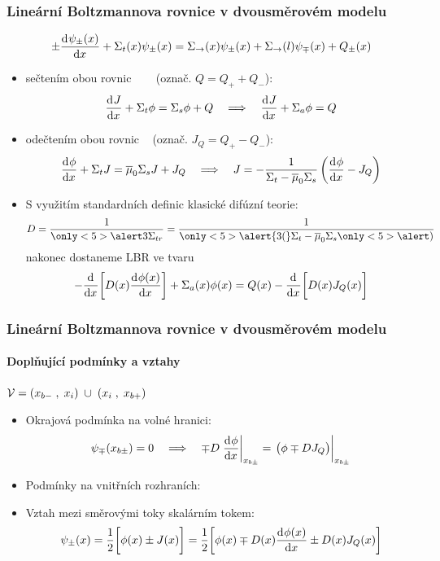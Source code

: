 \begin{frame}
  \frametitle{Lineární Boltzmannova rovnice v dvousměrovém modelu}

    $$
      \pm\frac{\mathrm{d}^{}{\psi_{\pm}(x)}}{\mathrm{d} {x}^{}} + \Sigma_t(x)\psi_{\pm}(x) = 
      \Sigma_{\rightarrow}(x)\psi_{\pm}(x) + \Sigma_{\rightarrow}(l)\psi_{\mp}(x) + Q_{\pm}(x)
    $$
    

    \begin{itemize}
    	\item<2-> sečtením obou rovnic ~~~ (označ. $Q = Q_+ + Q_-$):
    	$$
    	  \frac{\mathrm{d}^{}{J}}{\mathrm{d} {x}^{}} + \Sigma_t\phi = \Sigma_s\phi + Q
    	  \quad\Longrightarrow\quad
    	  \frac{\mathrm{d}^{}{J}}{\mathrm{d} {x}^{}} + \Sigma_a\phi = Q
    	$$
    	\item<3-> odečtením obou rovnic ~ (označ. $J_Q = Q_+ - Q_-$):
    	$$
    	  \frac{\mathrm{d}^{}{\phi}}{\mathrm{d} {x}^{}} + \Sigma_t J = \overline{\mu}_0\Sigma_s J + J_Q
    	  \quad\Longrightarrow\quad
    	  J = -\frac{1}{\Sigma_t-\overline{\mu}_0\Sigma_s}\left(\frac{\mathrm{d}^{}{\phi}}{\mathrm{d} {x}^{}} - J_Q\right)
    	$$
    	\item<4->[$\Rightarrow$] S využitím standardních definic \alert<5>{klasické difúzní teorie}:
    	$$
    	  D = \frac{1}{\only<5>{\alert3}\Sigma_{tr}} = \frac{1}{\only<5>{\alert{3(}}\Sigma_t-\muav\Sigma_s\only<5>{\alert)}}
    	$$
    	nakonec dostaneme LBR ve tvaru
    	$$
    	  -\frac{\mathrm{d}^{}{}}{\mathrm{d} {x}^{}}\bigg[D(x)\frac{\mathrm{d}^{}{\phi(x)}}{\mathrm{d} {x}^{}}\bigg] + \Sigma_a(x)\phi(x) = Q(x) - \frac{\mathrm{d}^{}{}}{\mathrm{d} {x}^{}}\bigg[D(x)J_Q(x)\bigg]
    	$$
    	\end{itemize}

\end{frame}

\begin{frame}
  \frametitle{Lineární Boltzmannova rovnice v dvousměrovém modelu}
  \framesubtitle{Doplňující podmínky a vztahy}
    \vspace{.75em}\centering $\mathcal{V} = (x_{b-}\;,\; x_i)\; \cup\; (x_i\; ,\; x_{b+})$\\[.25em]
    \begin{itemize}
    	\item Okrajová podmínka na volné hranici:
        $$
        \angflux_\mp(x_{b\pm}) = 0\quad \Longrightarrow\quad \mp D\left.\der{\flux}{x}\right\vert_{x_{b\pm}} = \left.\vphantom{\der{\flux}{x}}\big(\flux \mp D J_Q\big)\right\vert_{x_{b\pm}}
    		$$
    	\item Podmínky na vnitřních rozhraních:
    	\vspace{.5em}
    	\item Vztah mezi směrovými toky skalárním tokem:
    	$$
  	    \psi_\pm(x) = \frac12\bigg[\phi(x) \pm J(x)\bigg] = \frac12\bigg[\phi(x)\mp D(x)\frac{\mathrm{d}^{}{\phi(x)}}{\mathrm{d} {x}^{}} \pm D(x)J_Q(x)\bigg]
    	$$  	
    \end{itemize}

\end{frame}

